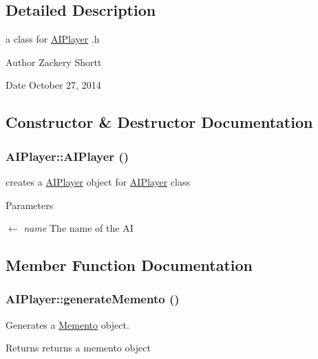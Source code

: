 \subsection{Detailed Description}
a class for \hyperlink{classAIPlayer}{AIPlayer} .h \begin{DoxyAuthor}{Author}
Zackery Shortt 
\end{DoxyAuthor}
\begin{DoxyDate}{Date}
October 27, 2014 
\end{DoxyDate}


\subsection{Constructor \& Destructor Documentation}
\hypertarget{classAIPlayer_ae791562645a443fead734b4bdcb1509e}{
\subsubsection[{AIPlayer}]{\setlength{\rightskip}{0pt plus 5cm}AIPlayer::AIPlayer ()}}
\label{classAIPlayer_ae791562645a443fead734b4bdcb1509e}


creates a \hyperlink{classAIPlayer}{AIPlayer} object for \hyperlink{classAIPlayer}{AIPlayer} class 
\begin{DoxyParams}{Parameters}
\item[\mbox{$\leftarrow$} {\em name}]The name of the AI \end{DoxyParams}


\subsection{Member Function Documentation}
\hypertarget{classAIPlayer_a83d0865c5869bbf02a66207976842de6}{
\subsubsection[{generateMemento}]{ AIPlayer::generateMemento ()}}
\label{classAIPlayer_a83d0865c5869bbf02a66207976842de6}


Generates a \hyperlink{classMemento}{Memento} object. \begin{DoxyReturn}{Returns}
returns a memento object 
\end{DoxyReturn}


